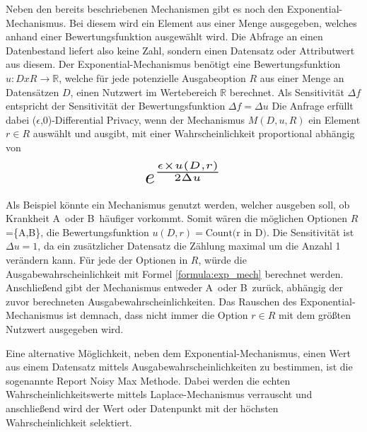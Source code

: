 Neben den bereits beschriebenen Mechanismen gibt es noch den Exponential-Mechanismus. 
Bei diesem wird ein Element aus einer Menge ausgegeben, welches anhand einer Bewertungsfunktion ausgewählt wird.
Die Abfrage an einen Datenbestand liefert also keine Zahl, sondern einen Datensatz oder Attributwert aus diesem.
Der Exponential-Mechanismus benötigt eine Bewertungsfunktion $u:D x R \xrightarrow{} \mathbb{R}$, welche für jede potenzielle Ausgabeoption $R$ aus einer Menge an Datensätzen $D$, einen Nutzwert im Wertebereich $\mathbb{R}$ berechnet.
Als Sensitivität $\Delta f$ entspricht der Sensitivität der Bewertungsfunktion $\Delta f = \Delta u$
Die Anfrage erfüllt dabei ($\epsilon$,0)-Differential Privacy, wenn der Mechanismus $M(D,u,R)$ ein Element $r \in R$ auswählt und ausgibt, mit einer Wahrscheinlichkeit proportional abhängig von
\begin{equation}\label{formula:exp_mech}
\resizebox{!}{0.8cm}{$
    e^{\frac{\epsilon \times u(D,r)}{2\Delta u}}
$}
\end{equation}


Als Beispiel könnte ein Mechanismus genutzt werden, welcher ausgeben soll, ob Krankheit \dq A\dq\ oder \dq B\dq\ häufiger vorkommt.
Somit wären die möglichen Optionen $R$=\{\dq A\dq,\dq B\dq\}, die Bewertungsfunktion $u(D,r)=\text{Count(r in D)}$.
Die Sensitivität ist $\Delta u = 1$, da ein zusätzlicher Datensatz die Zählung maximal um die Anzahl 1 verändern kann. 
Für jede der Optionen in $R$, würde die Ausgabewahrscheinlichkeit mit Formel \ref{formula:exp_mech} berechnet werden. 
Anschließend gibt der Mechanismus entweder \dq A\dq\ oder \dq B\dq\ zurück, abhängig der zuvor berechneten Ausgabewahrscheinlichkeiten.
Das Rauschen des Exponential-Mechanismus ist demnach, dass nicht immer die Option $r \in R$ mit dem größten Nutzwert ausgegeben wird. 

Eine alternative Möglichkeit, neben dem Exponential-Mechanismus, einen Wert aus einem Datensatz mittels Ausgabewahrscheinlichkeiten zu bestimmen, ist die sogenannte Report Noisy Max Methode. 
Dabei werden die echten Wahrscheinlichkeitswerte mittels Laplace-Mechanismus verrauscht und anschließend wird der Wert oder Datenpunkt mit der höchsten Wahrscheinlichkeit selektiert.


